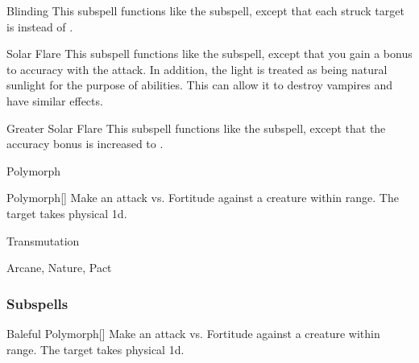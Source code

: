 \begin{ability}[\nth{4}]{Blinding}
This subspell functions like the  subspell, except that each struck target is  instead of .
\end{ability}
\vspace{0.25em}


\begin{ability}[\nth{4}]{Solar Flare}
This subspell functions like the  subspell, except that you gain a  bonus to accuracy with the attack.
In addition, the light is treated as being natural sunlight for the purpose of abilities.
This can allow it to destroy vampires and have similar effects.
\end{ability}
\vspace{0.25em}


\begin{ability}[\nth{7}]{Greater Solar Flare}
This subspell functions like the  subspell, except that the accuracy bonus is increased to .
\end{ability}
\vspace{0.25em}

\newpage
\begin{spellsection}{Polymorph}

\begin{spellheader}
\end{spellheader}


\begin{ability}{Polymorph}[]
Make an attack vs. Fortitude against a creature within \rngmed range.
\hit The target takes physical  \minus1d.
\end{ability}




 Transmutation

 Arcane, Nature, Pact
\end{spellsection}


\subsubsection{Subspells}


\begin{ability}[\nth{1}]{Baleful Polymorph}[]
Make an attack vs. Fortitude against a creature within \rngmed range.
\hit The target takes physical  \plus1d.
\end{ability}
\vspace{0.25em}


